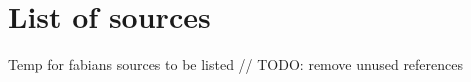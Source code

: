 \chapter{List of sources}
Temp for fabians sources to be listed
\newline
// TODO: remove unused references
\nocite{*}
\printbibliography[heading=none]
